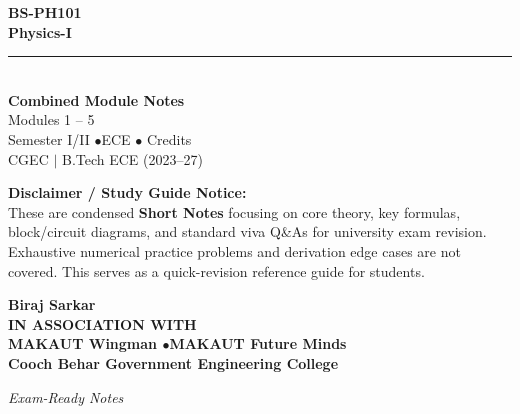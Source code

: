 \documentclass[12pt,a4paper]{article}
\begin{document}
\thispagestyle{empty}


\vspace*{1.0cm}
\begin{center}
  {\Huge\bfseries\color{myred} BS-PH101}\\[10pt]
  {\LARGE\bfseries\color{mydark} Physics-I}\\[20pt]
  {\color{myred}\rule{0.7\linewidth}{1.5pt}}\\[18pt]
  {\Large\color{myteal}\textbf{Combined Module Notes}}\\[8pt]
  {\large\color{mydark} Modules 1 -- 5}\\[40pt]
  {\normalsize\color{mydark} Semester I/II \quad$\bullet$\quad ECE \quad$\bullet$ Credits}\\[12pt]
  {\normalsize\color{mydark} CGEC \;$|$\; B.Tech ECE (2023--27)}
\end{center}
\vspace{1.0cm}
\begin{center}
  \begin{tcolorbox}[colback=mygray, colframe=mgframe, boxrule=0.5pt, arc=3pt, width=0.85\linewidth]
    \centering\small\color{mydark}
    \textbf{Disclaimer / Study Guide Notice:}\\
    These are condensed \textbf{Short Notes} focusing on core theory, key formulas, block/circuit diagrams, and standard viva Q\&As for university exam revision. Exhaustive numerical practice problems and derivation edge cases are not covered. This serves as a quick-revision reference guide for students.
  \end{tcolorbox}
\end{center}
\vfill
\vspace{0.6cm}
\begin{center}
  {\large\bfseries\color{mypurple} Biraj Sarkar}\\[16pt]
  {\footnotesize\color{watermark}\textbf{IN ASSOCIATION WITH}}\\[8pt]
  {\small\bfseries\color{mydark} MAKAUT Wingman \quad$\bullet$\quad MAKAUT Future Minds}\\[12pt]
  {\large\bfseries\color{myteal} Cooch Behar Government Engineering College}
\end{center}
\vfill
\begin{center}{\small\color{watermark}\textit{Exam-Ready Notes}}\end{center}
\clearpage
\end{document}
